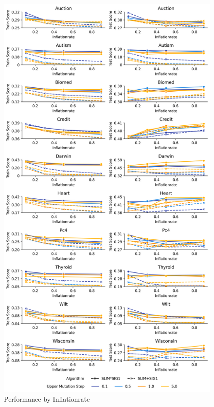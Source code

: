 
    \begin{figure}[h]
    \centering
    \includegraphics[width=\linewidth]{../Latex/Chapters/Figures/Results/inflationrate_performance_by_p_inflate.png}
    \caption{Performance by Inflationrate}
    \label{fig:performance_by_p_inflate}
    \end{figure}
    